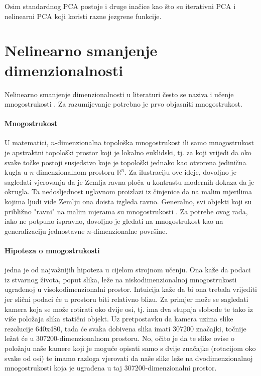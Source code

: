 \documentclass[times, utf8, diplomski]{fer}
\begin{document}
Osim standardnog PCA postoje i druge inačice kao što su iterativni PCA i nelinearni PCA koji koristi razne jezgrene  funkcije.

\newpage
\section{Nelinearno smanjenje dimenzionalnosti}\label{sec:nonlin_reduc}

Nelinearno smanjenje dimenzionalnosti u literaturi često se naziva i učenje mnogostrukosti . Za razumijevanje potrebno je prvo objasniti mnogostrukost.

\paragraph{Mnogostrukost}
U matematici, $n$-dimenzionalna topološka mnogostrukost ili samo mnogostrukost je apstraktni topološki prostor koji je lokalno euklidski, tj. za koji vrijedi da oko svake točke postoji susjedstvo koje je topološki jednako kao otvorena jedinična kugla u $n$-dimenzionalnom prostoru $\mathbb{R}^n$. Za ilustraciju ove ideje, dovoljno je sagledati vjerovanja da je Zemlja ravna ploča u kontrastu modernih dokaza da je okrugla. Ta nedosljednost uglavnom proizlazi iz činjenice da na malim mjerilima kojima ljudi vide Zemlju ona doista izgleda ravno. Generalno, svi objekti koji su približno "ravni" na malim mjerama su mnogostrukosti \citep{rowland}.
Za potrebe ovog rada, iako ne potpuno ispravno, dovoljno je gledati na mnogostrukost kao na generalizaciju jednostavne $n$-dimenzionalne površine.

\paragraph{Hipoteza o mnogostrukosti} jedna je od najvažnijih hipoteza u cijelom strojnom učenju. Ona kaže da podaci iz stvarnog života, poput slika, leže na niskodimenzionalnoj mnogostrukosti ugrađenoj u visokodimenzionalni prostor. Intuicija kaže da bi ona trebala vrijediti jer slični podaci će u prostoru biti relativno blizu. Za primjer može se sagledati kamera koja se može rotirati oko dvije osi, tj. ima dva stupnja slobode te tako iz više položaja slika statični objekt. Uz pretpostavku da kamera uzima slike rezolucije 640x480, tada će svaka dobivena slika imati 307200 značajki, točnije ležat će u 307200-dimenzionalnom prostoru. No, očito je da te slike ovise o položaju naše kamere koji je moguće opisati samo s dvije značajke (rotacijom oko svake od osi) te imamo razloga vjerovati da naše slike leže na dvodimenzionalnoj mnogostrukosti koja je ugrađena u taj 307200-dimenzionalni prostor.
\end{document}
